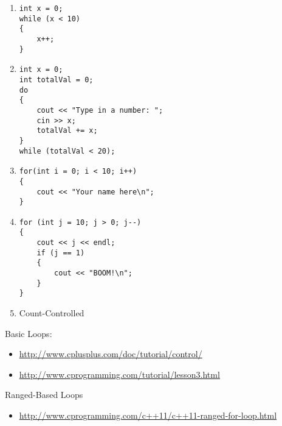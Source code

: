 \begin{enumerate}

\item
\noindent\begin{minipage}{\textwidth}\begin{lstlisting}
int x = 0;
while (x < 10)
{
	x++;
} 
\end{lstlisting}\end{minipage}

\item
\noindent\begin{minipage}{\textwidth}\begin{lstlisting}
int x = 0;
int totalVal = 0;
do
{
	cout << "Type in a number: "; 
	cin >> x;
	totalVal += x;
}
while (totalVal < 20); 
\end{lstlisting}\end{minipage}

\item 
\noindent\begin{minipage}{\textwidth}\begin{lstlisting}
for(int i = 0; i < 10; i++)
{
	cout << "Your name here\n";
}
\end{lstlisting}\end{minipage}

\item
\noindent\begin{minipage}{\textwidth}\begin{lstlisting}
for (int j = 10; j > 0; j--)
{
	cout << j << endl;
	if (j == 1)
	{
		cout << "BOOM!\n";
	}
}
\end{lstlisting}\end{minipage}

\item Count-Controlled

\end{enumerate}


Basic Loops:
\begin{itemize}
\item \url{http://www.cplusplus.com/doc/tutorial/control/}
\item \url{http://www.cprogramming.com/tutorial/lesson3.html}
\end{itemize}

\noindent Ranged-Based Loops
\begin{itemize}
\item \url{http://www.cprogramming.com/c++11/c++11-ranged-for-loop.html}
\end{itemize}



